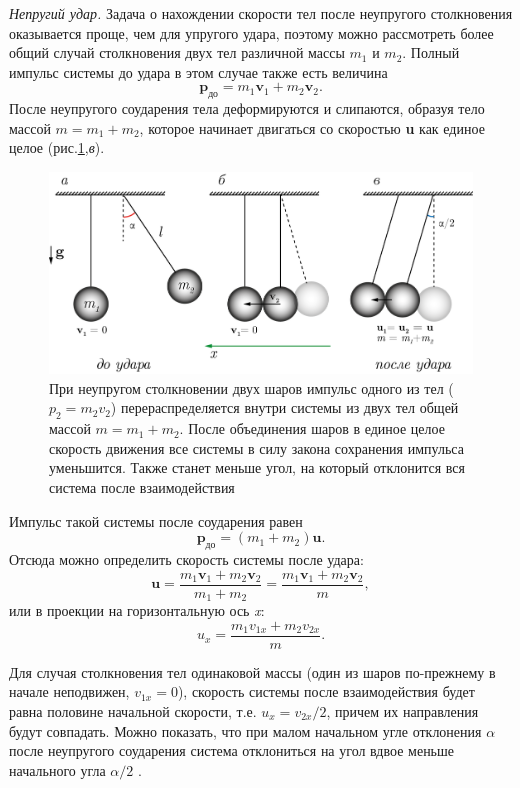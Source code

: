 \documentclass[14pt,a4paper,oneside]{extarticle}	%
\begin{document}
\textit{Непругий удар.}
Задача о нахождении скорости тел после неупругого столкновения оказывается проще, чем для упругого удара, поэтому можно рассмотреть более общий случай столкновения двух тел различной массы  $ m_1 $ и  $ m_2 $.
Полный импульс системы до удара в этом случае также есть величина $$ \textbf{p}_{\text{до}}  = m_1 \textbf{v}_1 + m_2 \textbf{v}_2.$$
После неупругого соударения тела деформируются и слипаются, образуя тело массой $m = m_1 + m_2 $, которое начинает двигаться со скоростью \textbf{u} как единое целое (рис.\ref{hit-5},\textit{в}).

\begin{figure}[H]
	\centering 	
	\includegraphics[width=0.9\linewidth]{hit-5.png}
	\caption{При неупругом столкновении двух шаров импульс одного из тел ($ p_2=m_2v_2 $) перераспределяется внутри системы из двух тел общей массой $ m= m_1 + m_2 $. После объединения шаров в единое целое скорость движения все системы в силу закона сохранения импульса уменьшится. Также станет меньше угол, на который отклонится вся система после взаимодействия}
	\label{hit-5}
\end{figure}

Импульс такой системы после соударения равен $$ \textbf{p}_{\text{до}}  = (m_1 + m_2) \textbf{u}.$$
Отсюда можно определить скорость системы после удара:
	\begin{equation}\label{hit-1eq6}
\textbf{u}  = \dfrac{m_1 \textbf{v}_1 + m_2 \textbf{v}_2}{m_1 + m_2}=\dfrac{m_1 \textbf{v}_1 + m_2 \textbf{v}_2}{m},
\end{equation}
или в проекции на горизонтальную ось \textit{x}:
	\begin{equation}\label{hit-1eq7}
u_x  = \dfrac{m_1 v_{1x} + m_2 v_{2x}}{m}.
\end{equation}

Для случая столкновения тел одинаковой массы (один из шаров по-прежнему в начале неподвижен, $ v_{1x}=0 $), скорость системы после взаимодействия будет равна половине начальной скорости, т.е. $ u_x = v_{2x}/2 $, причем их направления будут совпадать.
Можно показать, что при малом начальном угле отклонения $\alpha$ после неупругого соударения система отклониться на угол вдвое меньше начального угла $\alpha/2$ .
\end{document}
